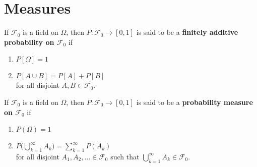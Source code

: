 %
%

%
%



\clearpage
\section{Measures}


\begin{definition}
If $\mathcal F_0$ is a field on $\Omega$, then $P:\mathcal F_0\rightarrow [0,1]$ is said to be a {\bf finitely additive probability on $\mathcal F_0$} if
\begin{enumerate}
\item $P[\Omega]=1$
\item $P[A\cup B]=P[A]+P[B]$ \\ for all disjoint $A, B\in\mathcal F_0$.
\end{enumerate}
\end{definition}




\begin{definition}
If $\mathcal F_0$ is a field on $\Omega$, then $P:\mathcal F_0\rightarrow [0,1]$ is said to be a {\bf probability measure on $\mathcal F_0$} if
\begin{enumerate}
\item $P(\Omega)=1$
\item $P\bigl( \bigcup_{k=1}^\infty A_k \bigr)=\sum_{k=1}^\infty P(A_k)$ \\ for all disjoint $A_1, A_2,\ldots \in\mathcal F_0$ such that $\bigcup_{k=1}^\infty A_k \in \mathcal F_0$.
\end{enumerate}
\end{definition}



